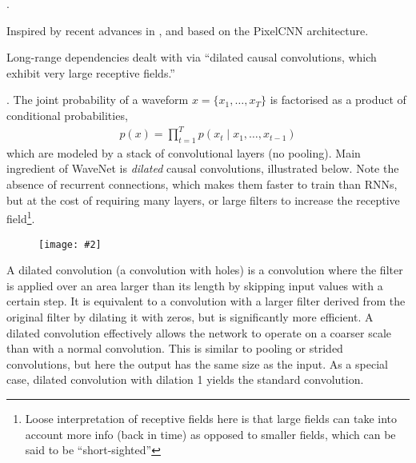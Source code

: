 \documentclass[11pt]{article}
\newcommand\myfig[2][0.3\textwidth]{\begin{figure}[h!]\centering\texttt{[image: \#2]}\end{figure}}
\newcommand\myspace[1][]{\vspace{#1\bigskipamount}}
\newcommand\p{\Needspace{10\baselineskip} \noindent}
\begin{document}

\label{Papers and Tutorials}



\myspace
\p {}. 
\begin{compactitem}
	\item Inspired by recent advances in , and based on the PixelCNN architecture.  
	
	\item Long-range dependencies dealt with via ``dilated causal convolutions, which exhibit very large receptive fields.''
\end{compactitem}

\myspace
\p {}. The joint probability of a waveform $x = \{x_1, \ldots, x_T\}$ is factorised as a product of conditional probabilities, 
\begin{align}
p(x) = \prod_{t = 1}^{T} p(x_t \mid x_1, \ldots, x_{t - 1})
\end{align}
which are modeled by a stack of convolutional layers (no pooling). Main ingredient of WaveNet is \textit{dilated} causal convolutions, illustrated below. Note the absence of recurrent connections, which makes them faster to train than RNNs, but at the cost of requiring many layers,  or large filters to increase the receptive field\footnote{Loose interpretation of receptive fields here is that large fields can take into account more info (back in time) as opposed to smaller fields, which can be said to be ``short-sighted''}. 

\myfig[0.5\textwidth]{CausalConv.PNG}

\begin{definition}
	A dilated convolution (a convolution with holes) is a convolution where the filter is applied over an area larger than its length by skipping input values with a certain step. It is equivalent to a convolution with a larger filter derived from the original filter by dilating it with zeros, but is significantly more efficient. A dilated convolution effectively allows the network to operate on
	a coarser scale than with a normal convolution. This is similar to pooling or strided convolutions, but
	here the output has the same size as the input. As a special case, dilated convolution with dilation
	1 yields the standard convolution.
\end{definition}
\end{document}
